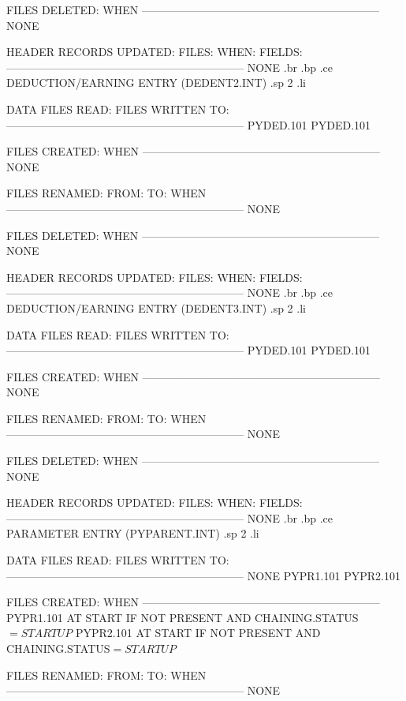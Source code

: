 FILES DELETED:			  WHEN
-----------------------------------------------------------------
     NONE


HEADER RECORDS UPDATED:
FILES:		 WHEN:		    FIELDS:
-----------------------------------------------------------------
     NONE
.br
.bp
.ce
DEDUCTION/EARNING ENTRY  (DEDENT2.INT)
.sp 2
.li

DATA FILES READ:		   FILES WRITTEN TO:
-----------------------------------------------------------------
       PYDED.101			PYDED.101

FILES CREATED:			  WHEN
-----------------------------------------------------------------
       NONE


FILES RENAMED:
  FROM:        TO:		  WHEN
-----------------------------------------------------------------
     NONE


FILES DELETED:			  WHEN
-----------------------------------------------------------------
     NONE


HEADER RECORDS UPDATED:
FILES:		 WHEN:		    FIELDS:
-----------------------------------------------------------------
     NONE
.br
.bp
.ce
DEDUCTION/EARNING ENTRY  (DEDENT3.INT)
.sp 2
.li

DATA FILES READ:		   FILES WRITTEN TO:
-----------------------------------------------------------------
       PYDED.101			PYDED.101

FILES CREATED:			  WHEN
-----------------------------------------------------------------
       NONE


FILES RENAMED:
  FROM:        TO:		  WHEN
-----------------------------------------------------------------
     NONE


FILES DELETED:			  WHEN
-----------------------------------------------------------------
     NONE


HEADER RECORDS UPDATED:
FILES:		 WHEN:		    FIELDS:
-----------------------------------------------------------------
     NONE
.br
.bp
.ce
PARAMETER ENTRY  (PYPARENT.INT)
.sp 2
.li

DATA FILES READ:		   FILES WRITTEN TO:
-----------------------------------------------------------------
       NONE				PYPR1.101
					PYPR2.101

FILES CREATED:			  WHEN
-----------------------------------------------------------------
       PYPR1.101	      AT START IF NOT PRESENT AND
			      CHAINING.STATUS$=STARTUP$
       PYPR2.101	      AT START IF NOT PRESENT AND
			      CHAINING.STATUS$=STARTUP$


FILES RENAMED:
  FROM:        TO:		  WHEN
-----------------------------------------------------------------
      NONE


